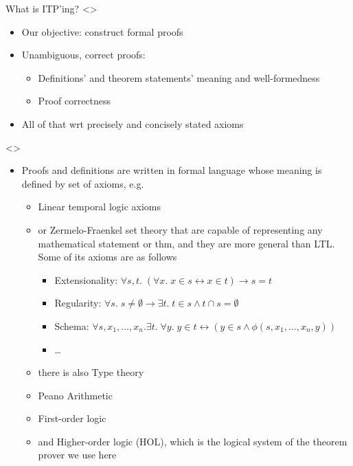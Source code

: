 \documentclass[compress,10pt,xcolor=dvipsnames]{beamer}
\begin{document}
\begin{frame}{What is ITP'ing?}
\only<\formalproof>{
  \begin{itemize}
  \item Our objective: construct formal proofs
  \item Unambiguous, correct proofs:
    \begin{itemize}
    \item Definitions' and theorem statements' meaning and well-formedness
    \item Proof correctness
    \end{itemize}
  \item All of that wrt precisely and concisely stated axioms
  \end{itemize}
}

\note<\axioms>{
  \tiny
  \begin{itemize}
  \item Proofs and definitions are written in formal language whose meaning is defined by set of axioms, e.g.
    \begin{itemize}
    \item Linear temporal logic axioms
    \item or Zermelo-Fraenkel set theory that are capable of representing any mathematical statement or thm, and they are more general than LTL. Some of its axioms are as follows
      \begin{itemize}
        \item Extensionality: {\small $\forall s,t.\; (\forall x.\; x\in s \leftrightarrow x\in t) \rightarrow s = t$}
        \item Regularity: {\small $\forall s.\; s\neq\emptyset \rightarrow \exists t.\; t\in s \wedge t\cap s =\emptyset$}
        \item Schema: {\small $\forall s,x_1,\dots,x_n.\exists t.\; \forall y.\; y\in t \leftrightarrow (y\in s \wedge \phi(s,x_1,\dots,x_n,y))$}
        \item \dots
      \end{itemize}
    \item there is also Type theory
    \item Peano Arithmetic
    \item First-order logic
    \item and Higher-order logic (HOL), which is the logical system of the theorem prover we use here
    \end{itemize}
  \end{itemize}
}


\end{frame}
\end{document}
